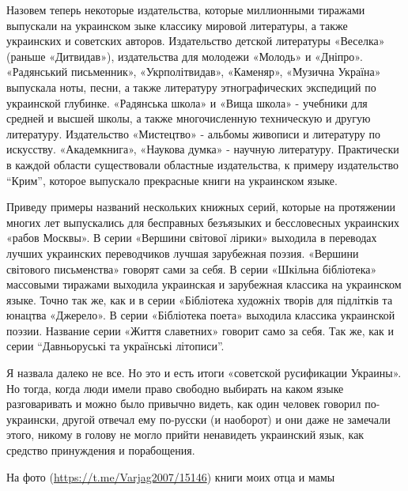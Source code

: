 Назовем теперь некоторые издательства, которые миллионными тиражами выпускали
на украинском зыке классику мировой литературы, а также украинских и советских
авторов. Издательство детской литературы «Веселка» (раньше «Дитвидав»),
издательства для молодежи «Молодь» и «Дніпро». «Радянський письменник»,
«Укрполітвидав», «Каменяр», «Музична Україна» выпускала ноты, песни, а также
литературу этнографических экспедиций по украинской глубинке. «Радянська школа»
и «Вища школа» - учебники для средней и высшей школы, а также многочисленную
техническую и другую литературу. Издательство «Мистецтво» - альбомы живописи и
литературу по искусству. «Академкнига», «Наукова думка» - научную литературу.
Практически в каждой области существовали областные издательства, к примеру
издательство \enquote{Крим}, которое выпускало прекрасные книги на украинском языке.

Приведу примеры названий нескольких книжных серий, которые на протяжении многих
лет выпускались для бесправных безъязыких и бессловесных украинских «рабов
Москвы». В серии «Вершини світової лірики» выходила в переводах лучших
украинских переводчиков лучшая зарубежная поэзия. «Вершини світового
письменства» говорят сами за себя. В серии «Шкільна бібліотека» массовыми
тиражами выходила украинская и зарубежная классика на украинском языке. Точно
так же, как и в серии «Бібліотека художніх творів для підлітків та юнацтва
«Джерело». В серии «Бібліотека поета» выходила классика украинской поэзии.
Название серии «Життя славетних» говорит само за себя. Так же, как и серии
\enquote{Давньоруські та українські літописи}.

Я назвала далеко не все. Но это и есть итоги «советской русификации Украины».
Но тогда, когда люди имели право свободно выбирать на каком языке разговаривать
и можно было привычно видеть, как один человек говорил по-украински, другой
отвечал ему по-русски (и наоборот) и они даже не замечали этого, никому в
голову не могло прийти ненавидеть украинский язык, как средство принуждения и
порабощения.

На фото (\url{https://t.me/Varjag2007/15146})  книги моих отца и мамы
